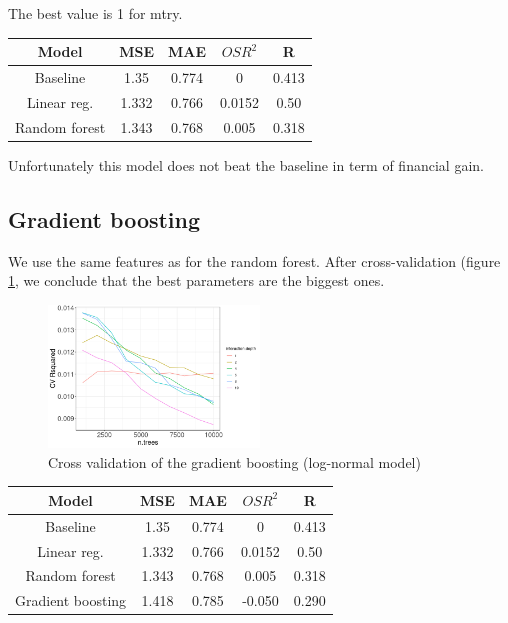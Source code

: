 \documentclass[11pt, english, letterpaper]{article}
\begin{document}
The best value is 1 for mtry.

\begin{center}
    \begin{tabular}{c|cccc}
    Model & MSE & MAE & $OSR^2$ & R\\
          \hline
    Baseline & 1.35 & 0.774 & 0 & 0.413\\
    Linear reg. & 1.332  & 0.766 & 0.0152 & 0.50\\
    Random forest & 1.343 & 0.768 & 0.005 & 0.318
    \end{tabular}
\end{center}

Unfortunately this model does not beat the baseline in term of financial gain.

\subsection{Gradient boosting}

We use the same features as for the random forest. After cross-validation (figure \ref{Boosting}, we conclude that the best parameters are the biggest ones.

\begin{figure}[!h]
    \centering
    \includegraphics[width=0.5\textwidth]{CV_R2_boosting.png}
    \caption{Cross validation of the gradient boosting (log-normal model)}
    \label{Boosting}
\end{figure}

\begin{center}
    \begin{tabular}{c|cccc}
    Model & MSE & MAE & $OSR^2$ & R\\
          \hline
    Baseline & 1.35 & 0.774 & 0 & 0.413\\
    Linear reg. & 1.332  & 0.766 & 0.0152 & 0.50\\
    Random forest & 1.343 & 0.768 & 0.005 & 0.318\\
    Gradient boosting & 1.418 & 0.785 & -0.050 & 0.290
    \end{tabular}
\end{center}
\end{document}
